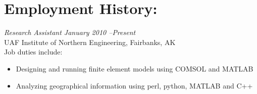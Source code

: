 \documentclass[10pt, letterpaper]{resume}
\begin{document}
\begin{comment}
Suggested by Lisa's dad, but not by Career Services.
I think this is largely irrelevant due to my possession of a bachelors degree.
\large\textit{High School Diploma \hfill May 2005}\normalsize \\
Susitna Valley Junior Senior High School\\
\emph{Graduated with a 3.73 GPA}

New section, trying it out
Currently canning this section but THAT'S OKAY
\section*{\underline{\textit{Projects:}}}
\large\textit{Super Four-Bar Explorer \hfill December 2008}\normalsize
\small\begin{itemize}
\item A program written in python that uses a Gauss-Newton unconstrained optimization algorithm to fit the path traced by a four bar linkage to a given set of points
\item Accompanied by a spreadsheet that illustrates four-bar linkage traced paths
\end{itemize}\normalsize\medskip

Another new section, recommended by Career Services. At worst, I have the
wording for it, amirite?
\section*{\underline{\textit{Service:}}}
\tiny\begin{enumerate}
\item Administered the web site and Facebook page for ASME's UAF student chapter \hfill 2009--2010
\item Volunteered at the UAF College of Engineering and Mines' Engineer's Week Open House \hfill February 2010
\end{enumerate}\normalsize

\large\textit{Society of Automotive Engineers, UAF
Chapter\hfill2009}\normalsize\\
\textit{Treasurer}
\end{comment}

\section{Employment History:}

\large\textit{Research Assistant \hfill January 2010 --Present}\normalsize \\
UAF Institute of Northern Engineering, Fairbanks, AK\\
Job duties include:
\small\begin{itemize}
\item Designing and running finite element models using COMSOL and MATLAB
\item Analyzing geographical information using perl, python, MATLAB and C++
\end{itemize}\normalsize\medskip
\end{document}
